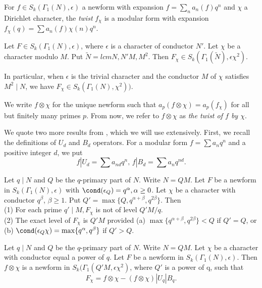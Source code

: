 \documentclass [11pt, proquest] {uwthesis}[2015/03/03]
\begin{document}
For $f \in S_k(\Gamma_1(N), \epsilon)$ a newform with expansion $f = \sum_n a_n(f) q^n$ and $\chi$ a Dirichlet character, the {\it twist} $f_\chi$ is a modular form with expansion $f_\chi (q) = \sum a_n(f) \chi(n)  q^n$. 

\begin{Lemma}\cite[Proposition 3.1]{atkin1978twists}
Let $F \in S_k(\Gamma_1(N), \epsilon)$, where $\epsilon$ is a character of conductor $N'$.  Let $\chi$ be a character modulo $M$. Put $\tilde{N} = lcm{N, N'M, M^2}$. Then $F_\chi \in S_k(\Gamma_1(\tilde{N}), \epsilon \chi^2)$.
\end{Lemma}

In particular, when $\epsilon$ is the trivial character and the conductor $M$ of $\chi$ satisfies $M^2 \mid N$, we have
$F_\chi \in S_k(\Gamma_1(N), \chi^2))$.

We write $f \otimes \chi$ for the unique newform such that $a_p(f \otimes \chi) = a_p(f_\chi)$ for all but finitely many primes $p$. From now, we refer to $f \otimes \chi$ as {\it the twist of $f$ by $\chi$}. 

We quote two more results from \cite{atkin1978twists}, which we will use extensively. First, we recall the definitions of  $U_d$ and $B_d$ operators. For a modular form $f = \sum a_n q^n$ and a positive integer $d$, we put 
\[
	f |U_d = \sum a_{nd} q^n, \,  f |B_d = \sum a_n q^{nd}.
\]





\begin{Lemma}\cite[Theorem 3.1]{atkin1978twists} \label{lemma: winnie-level}
Let $q \mid N$ and $Q$ be the $q$-primary part of $N$. Write $N = QM$. Let $F$ be a newform in $S_k(\Gamma_1(N), \epsilon)$ with $\cond(\epsilon_Q) = q^{\alpha}, \alpha \geq 0$. Let $\chi$ be a character with conductor $q^{\beta}$, $\beta \geq 1$. Put $Q' = \max\{Q,q^{\alpha + \beta}, q^{2\beta}\}$. Then \\
(1)  For each prime $q' \mid M, F_\chi$ is not of level $Q'M/q$. \\
(2)  The exact level of $F_\chi$ is $Q'M$ provided (a) $\max\{q^{\alpha + \beta}, q^{2\beta}\} < Q$ if $Q' = Q$, or 
(b) $\cond(\epsilon_Q \chi) = \max \{q^{\alpha}, q^{\beta} \}$ if $Q' > Q$.
\end{Lemma}


\begin{Lemma}\cite[Theorem 3.2]{atkin1978twists}
Let $q \mid N$ and $Q$ be the $q$-primary part of $N$. Write $N = QM$. Let $\chi$ be a character with conductor equal a power of $q$.  Let $F$ be a newform in $S_k(\Gamma_1(N), \epsilon)$. Then $f \otimes \chi$  is a newform in $S_k(\Gamma_1(Q'M,\epsilon \chi^2)$, where $Q'$ is a power of q, such that $$F_\chi  = f \otimes \chi - (f \otimes \chi) |U_q |B_q.$$
\end{Lemma}
\end{document}
